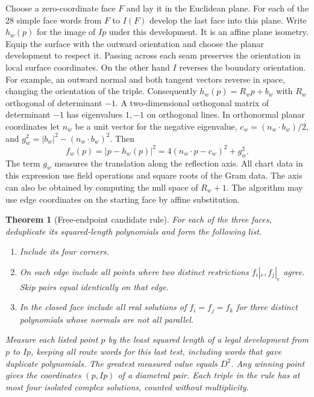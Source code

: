 \documentclass[10pt,letterpaper]{article}
\newtheorem{theorem}{Theorem}
\begin{document}
Choose a zero-coordinate face $F$ and lay it in the Euclidean plane.
For each of the 28 simple face words from $F$ to $I(F)$ develop the
last face into this plane. Write $h_w(p)$ for the image of $Ip$ under
this development. It is an affine plane isometry. Equip the surface
with the outward orientation and choose the planar development to
respect it. Passing across each seam preserves the orientation in
local surface coordinates. On the other hand $I$ reverses the
boundary orientation. For example, an outward normal and both
tangent vectors reverse in space, changing the orientation of the
triple. Consequently $h_w(p)=R_wp+b_w$ with $R_w$ orthogonal of
determinant $-1$. A two-dimensional orthogonal matrix of determinant
$-1$ has eigenvalues $1,-1$ on orthogonal lines. In orthonormal planar
coordinates let $n_w$ be a unit vector for the negative eigenvalue,
$c_w=(n_w\cdot b_w)/2$, and $g_w^2=|b_w|^2-(n_w\cdot b_w)^2$. Then
\begin{equation}
 f_w(p)=|p-h_w(p)|^2
       =4(n_w\cdot p-c_w)^2+g_w^2.                 \label{eq:glide}
\end{equation}
The term $g_w$ measures the translation along the reflection axis.
All chart data in this expression use field operations and square
roots of the Gram data. The axis can also be obtained by computing
the null space of $R_w+1$. The algorithm may use edge coordinates
on the starting face by affine substitution.

\begin{theorem}[Free-endpoint candidate rule]
For each of the three faces, deduplicate its squared-length polynomials
and form the following list.
\begin{enumerate}
\item Include its four corners.
\item On each edge include all points where two distinct restrictions
$f_i|_e,f_j|_e$ agree. Skip pairs equal identically on that edge.
\item In the closed face include all real solutions of
$f_i=f_j=f_k$ for three distinct polynomials whose normals are not all
parallel.
\end{enumerate}
Measure each listed point $p$ by the least squared length of a
\emph{legal} development from $p$ to $Ip$, keeping all route words
for this last test, including words that gave duplicate polynomials.
The greatest measured value equals $D^2$. Any winning point gives the
coordinates $(p,Ip)$ of a diametral pair. Each triple in the rule has
at most four isolated complex solutions, counted without multiplicity.
\end{theorem}
\end{document}
